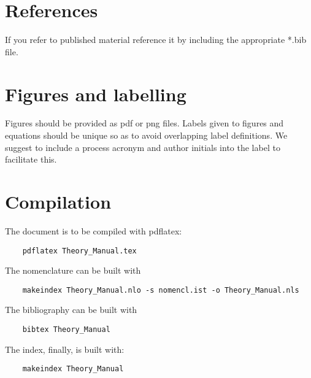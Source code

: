 \section{References}
If you refer to published material reference it by including the appropriate *.bib file.

\section{Figures and labelling}
Figures should be provided as pdf or png files. Labels given to figures and equations should be unique so as to avoid overlapping label definitions. We suggest to include a process acronym and author initials into the label to facilitate this.

\section{Compilation}
The document is to be compiled with pdflatex:
\begin{verbatim}
	pdflatex Theory_Manual.tex
\end{verbatim}
The nomenclature can be built with
\begin{verbatim}
	makeindex Theory_Manual.nlo -s nomencl.ist -o Theory_Manual.nls
\end{verbatim}
The bibliography can be built with 
\begin{verbatim}
	bibtex Theory_Manual
\end{verbatim}
The index, finally, is built with:
\begin{verbatim}
	makeindex Theory_Manual
\end{verbatim}